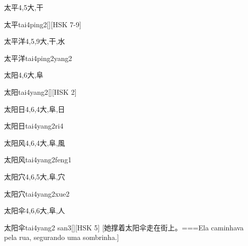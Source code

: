 \begin{Entry}{太平}{4,5}{⼤,⼲}
  \begin{Phonetics}{太平}{tai4ping2}[][HSK 7-9]
  \end{Phonetics}
\end{Entry}

\begin{Entry}{太平洋}{4,5,9}{⼤,⼲,⽔}
  \begin{Phonetics}{太平洋}{tai4ping2yang2}
  \end{Phonetics}
\end{Entry}

\begin{Entry}{太阳}{4,6}{⼤,⾩}
  \begin{Phonetics}{太阳}{tai4yang2}[][HSK 2]
  \end{Phonetics}
\end{Entry}

\begin{Entry}{太阳日}{4,6,4}{⼤,⾩,⽇}
  \begin{Phonetics}{太阳日}{tai4yang2ri4}
  \end{Phonetics}
\end{Entry}

\begin{Entry}{太阳风}{4,6,4}{⼤,⾩,⾵}
  \begin{Phonetics}{太阳风}{tai4yang2feng1}
  \end{Phonetics}
\end{Entry}

\begin{Entry}{太阳穴}{4,6,5}{⼤,⾩,⽳}
  \begin{Phonetics}{太阳穴}{tai4yang2xue2}
  \end{Phonetics}
\end{Entry}

\begin{Entry}{太阳伞}{4,6,6}{⼤,⾩,⼈}
  \begin{Phonetics}{太阳伞}{tai4yang2 san3}[][HSK 5]
    [她撑着太阳伞走在街上。===Ela caminhava pela rua, segurando uma sombrinha.]
  \end{Phonetics}
\end{Entry}

